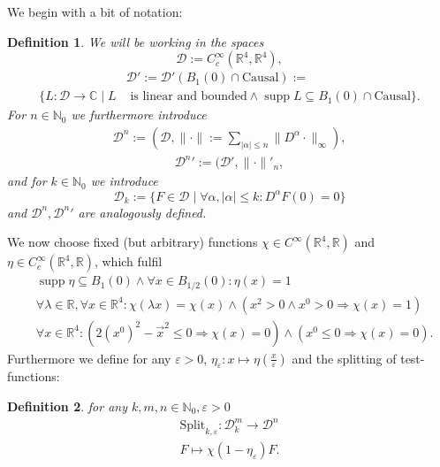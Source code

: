 \documentclass[oneside,reqno,12pt]{amsart}
\newtheorem{Def}{Definition}[section]
\DeclareMathOperator{\supp}{supp}
\begin{document}
We begin with a bit of notation:
\begin{Def} We will be working in the spaces
\begin{equation}
\mathcal{D}:=C_c^\infty(\mathbb{R}^4,\mathbb{R}^4),
\end{equation}
\begin{align}\tag*{}
&\mathcal{D}':=\mathcal{D}'(B_1(0)\cap \text{Causal}):=\\
 \{L:\mathcal{D}\rightarrow \mathbb{C}\mid L &\text{ is linear and bounded}\wedge \supp L \subseteq B_1(0)\cap \text{Causal} \}.
\end{align}
For \(n\in\mathbb{N}_0\) we furthermore introduce
\begin{align}
\mathcal{D}^n:=(\mathcal{D},\|\cdot \|:= \sum_{|\alpha|\le n} \|D^\alpha \cdot \|_{\infty}),
\end{align}
\begin{align}
{\mathcal{D}^n}':= (\mathcal{D}',\|\cdot \|'_n ,
\end{align}
and for \(k\in\mathbb{N}_0\) we introduce
\begin{equation}
\mathcal{D}_k:=\{F\in\mathcal{D}\mid \forall \alpha, |\alpha|\le k: D^\alpha F(0)=0\}
\end{equation}
and \(\mathcal{D}^n, {\mathcal{D}^n}'\) are analogously defined. 
\end{Def}
We now choose fixed (but arbitrary) functions \(\chi\in C^\infty(\mathbb{R}^4,\mathbb{R})\) and \( \eta\in C_c^\infty(\mathbb{R}^4,\mathbb{R})\), which fulfil
\begin{align*}
&\supp \eta\subseteq B_1(0) \wedge \forall x \in B_{1/2}(0): \eta (x)=1\\
&\forall \lambda\in\mathbb{R}, \forall x \in \mathbb{R}^4: \chi (\lambda x ) = \chi(x)\wedge (x^2>0\wedge x^0>0 \Rightarrow \chi(x)=1)\\
& \forall x\in\mathbb{R}^4: \left(2 (x^0)^2-  {\vec{x}}^2\le 0 \Rightarrow \chi(x)=0\right)\wedge (x^0 \le 0\Rightarrow \chi(x)=0).
\end{align*}
Furthermore we define for any \(\varepsilon>0\),  \(\eta_\varepsilon : x\mapsto \eta\left(\frac{x}{\varepsilon}\right)\)
and the splitting of test-functions:
\begin{Def} for any \(k,m,n\in\mathbb{N}_0,\varepsilon>0\)
\begin{align}\tag*{}
\text{Split}_{k,\varepsilon}:\mathcal{D}_k^m\rightarrow \mathcal{D}^n\\
F\mapsto \chi (1-\eta_\varepsilon) F.
\end{align}
\end{Def}
\end{document}
